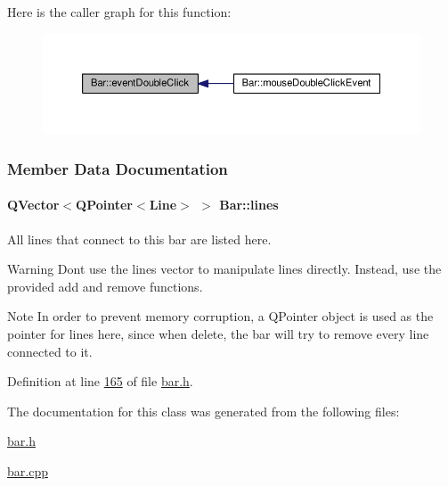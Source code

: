 Here is the caller graph for this function\+:
\nopagebreak
\begin{figure}[H]
\begin{center}
\leavevmode
\includegraphics[width=350pt]{class_bar_a66bcbd19582dddee7e171ae5a4475f4b_icgraph}
\end{center}
\end{figure}




\subsubsection{Member Data Documentation}
\hypertarget{class_bar_a5aabf1f4ac22e20e9cb702a3a7e08eea}{}
\paragraph[{lines}]{\setlength{\rightskip}{0pt plus 5cm}Q\+Vector$<$Q\+Pointer$<${\bf Line}$>$ $>$ Bar\+::lines}\label{class_bar_a5aabf1f4ac22e20e9cb702a3a7e08eea}
All lines that connect to this bar are listed here.

\begin{DoxyWarning}{Warning}
Don\textquotesingle{}t use the lines vector to manipulate lines directly. Instead, use the provided add and remove functions.
\end{DoxyWarning}
\begin{DoxyNote}{Note}
In order to prevent memory corruption, a Q\+Pointer object is used as the pointer for lines here, since when delete, the bar will try to remove every line connected to it. 
\end{DoxyNote}


Definition at line \hyperlink{bar_8h_source_l00165}{165} of file \hyperlink{bar_8h_source}{bar.\+h}.



The documentation for this class was generated from the following files\+:\begin{DoxyCompactItemize}
\item 
\hyperlink{bar_8h}{bar.\+h}\item 
\hyperlink{bar_8cpp}{bar.\+cpp}\end{DoxyCompactItemize}
